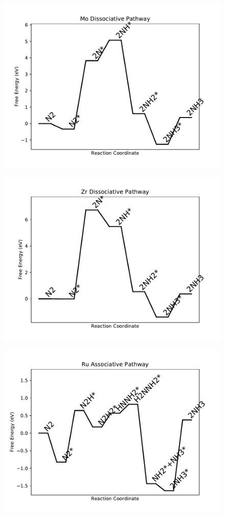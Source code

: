 \begin{figure}
\centering
\includegraphics[width=0.8\linewidth]{data/plots/Mo_dissociative.pdf}
\end{figure}

\begin{figure}
\centering
\includegraphics[width=0.8\linewidth]{data/plots/Zr_dissociative.pdf}
\end{figure}

\begin{figure}
\centering
\includegraphics[width=0.8\linewidth]{data/plots/Ru_associative.pdf}
\end{figure}

